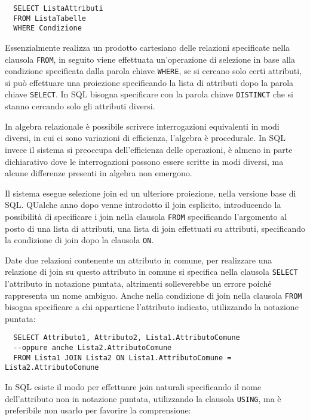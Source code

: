 \documentclass{article}
\numberwithin{equation}{subsection}
\begin{document}
\begin{verbatim}
  SELECT ListaAttributi
  FROM ListaTabelle
  WHERE Condizione
\end{verbatim}

Essenzialmente realizza un prodotto cartesiano delle relazioni specificate nella clausola \verb|FROM|, in seguito viene effettuata un'operazione di selezione in base alla 
condizione specificata dalla parola chiave \verb|WHERE|, se si cercano solo certi attributi, si può effettuare una proiezione specificando la lista di attributi dopo 
la parola chiave \verb|SELECT|. In SQL bisogna specificare con la parola chiave \verb|DISTINCT| che si stanno cercando solo gli attributi diversi. 


In algebra relazionale è possibile scrivere interrogazioni equivalenti in modi diversi, in cui ci sono variazioni di efficienza, 
l'algebra è procedurale. In SQL invece il sistema si preoccupa dell'efficienza delle operazioni, è almeno in parte dichiarativo dove le interrogazioni 
possono essere scritte in modi diversi, ma alcune differenze presenti in algebra non emergono. 


Il sistema esegue selezione join ed un ulteriore proiezione, nella versione base di SQL. QUalche anno dopo venne introdotto il join esplicito, 
introducendo la possibilità di specificare i join nella clausola \verb|FROM| specificando l'argomento al posto di una lista di attributi, una lista 
di join effettuati su attributi, specificando la condizione di join dopo la clausola \verb|ON|. 

Date due relazioni contenente un attributo in comune, per realizzare una relazione di join su questo attributo in comune si specifica nella 
clausola \verb|SELECT| l'attributo in notazione puntata, altrimenti solleverebbe un errore poiché rappresenta un nome ambiguo. Anche nella 
condizione di join nella clausola \verb|FROM| bisogna specificare a chi appartiene l'attributo indicato, utilizzando la notazione puntata: 

\begin{verbatim}
  SELECT Attributo1, Attributo2, Lista1.AttributoComune 
  --oppure anche Lista2.AttributoComune
  FROM Lista1 JOIN Lista2 ON Lista1.AttributoComune = Lista2.AttributoComune
\end{verbatim}

In SQL esiste il modo per effettuare join naturali specificando il nome dell'attributo non in notazione puntata, utilizzando la clausola \verb|USING|, 
ma è preferibile non usarlo per favorire la comprensione:
\end{document}
